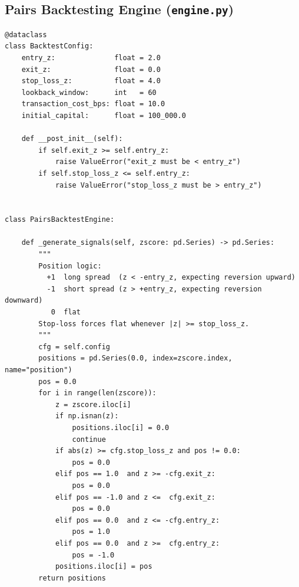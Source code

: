 \documentclass[a4paper]{report}
\begin{document}
\subsection{Pairs Backtesting Engine (\texttt{engine.py})}

\begin{Verbatim}[fontsize=\footnotesize, baselinestretch=0.85]
@dataclass
class BacktestConfig:
    entry_z:              float = 2.0
    exit_z:               float = 0.0
    stop_loss_z:          float = 4.0
    lookback_window:      int   = 60
    transaction_cost_bps: float = 10.0
    initial_capital:      float = 100_000.0

    def __post_init__(self):
        if self.exit_z >= self.entry_z:
            raise ValueError("exit_z must be < entry_z")
        if self.stop_loss_z <= self.entry_z:
            raise ValueError("stop_loss_z must be > entry_z")


class PairsBacktestEngine:

    def _generate_signals(self, zscore: pd.Series) -> pd.Series:
        """
        Position logic:
          +1  long spread  (z < -entry_z, expecting reversion upward)
          -1  short spread (z > +entry_z, expecting reversion downward)
           0  flat
        Stop-loss forces flat whenever |z| >= stop_loss_z.
        """
        cfg = self.config
        positions = pd.Series(0.0, index=zscore.index, name="position")
        pos = 0.0
        for i in range(len(zscore)):
            z = zscore.iloc[i]
            if np.isnan(z):
                positions.iloc[i] = 0.0
                continue
            if abs(z) >= cfg.stop_loss_z and pos != 0.0:
                pos = 0.0
            elif pos == 1.0  and z >= -cfg.exit_z:
                pos = 0.0
            elif pos == -1.0 and z <=  cfg.exit_z:
                pos = 0.0
            elif pos == 0.0  and z <= -cfg.entry_z:
                pos = 1.0
            elif pos == 0.0  and z >=  cfg.entry_z:
                pos = -1.0
            positions.iloc[i] = pos
        return positions


\end{Verbatim}
\end{document}
